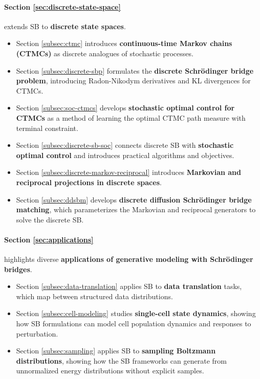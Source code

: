 \documentclass{article}
\begin{document}
\paragraph{Section \ref{sec:discrete-state-space}} extends SB to \textbf{discrete state spaces}.
\begin{itemize}
    \item Section \ref{subsec:ctmc} introduces \textbf{continuous-time Markov chains (CTMCs)} as discrete analogues of stochastic processes.
    \item Section \ref{subsec:discrete-sbp} formulates the \textbf{discrete Schrödinger bridge problem}, introducing Radon-Nikodym derivatives and KL divergences for CTMCs.
    \item Section \ref{subsec:soc-ctmcs} develops \textbf{stochastic optimal control for CTMCs} as a method of learning the optimal CTMC path measure with terminal constraint. 
    \item Section \ref{subsec:discrete-sb-soc} connects discrete SB with \textbf{stochastic optimal control} and introduces practical algorithms and objectives. 
    \item Section \ref{subsec:discrete-markov-reciprocal} introduces \textbf{Markovian and reciprocal projections in discrete spaces}.
    \item Section \ref{subsec:ddsbm} develops \textbf{discrete diffusion Schrödinger bridge matching}, which parameterizes the Markovian and reciprocal generators to solve the discrete SB.
\end{itemize}

\paragraph{Section \ref{sec:applications}} highlights diverse \textbf{applications of generative modeling with Schrödinger bridges}.
\begin{itemize}
    \item Section \ref{subsec:data-translation} applies SB to \textbf{data translation} tasks, which map between structured data distributions. 
    \item Section \ref{subsec:cell-modeling} studies \textbf{single-cell state dynamics}, showing how SB formulations can model cell population dynamics and responses to perturbation.
    \item Section \ref{subsec:sampling} applies SB to \textbf{sampling Boltzmann distributions}, showing how the SB frameworks can generate from unnormalized energy distributions without explicit samples.
\end{itemize}
\end{document}
